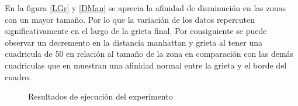 \documentclass[12pt, letterpaper] {article}
\begin{document}
En la figura \ref{LGr} y \ref{DMan} se aprecia la afinidad de disminución en las zonas con un mayor tamaño. Por lo que la variación de los datos repercuten significativamente en el largo de la grieta final. Por consiguiente se puede observar un decremento en la distancia manhattan y grieta al tener una cuadricula de 50 en relación al tamaño de la zona en comparación con las demás cuadriculas que en muestran una afinidad normal entre la grieta y el borde del cuadro.

\begin{figure}[H]
\centering
{}\vspace{-1mm}
\vspace{-1mm}
\caption{Resultados de ejecución del experimento} \label{DMTG}
\end{figure}\vspace{-2mm}
\end{document}
